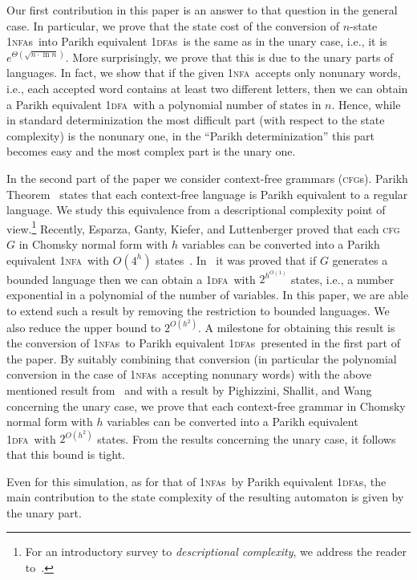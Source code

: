 \documentclass[11pt]{article}
\newcommand*{\ow}{\textsc{1}}
\newcommand*{\owdfa}{\ow\textsc{dfa}}
\newcommand*{\owdfas}{\ow\textsc{dfa}s}
\newcommand*{\ownfa}{\ow\textsc{nfa}}
\newcommand*{\ownfas}{\ow\textsc{nfa}s}
\newcommand*{\cfg}{\textsc{cfg}}
\newcommand*{\cfgs}{\textsc{cfg}s}
\begin{document}
Our first contribution in this paper is an answer to that question in the general case.
In particular, we prove that the state cost of the conversion of $n$-state \ownfas\ into Parikh equivalent \owdfas\ is the
same as in the unary case, i.e., it is $e^{\Theta(\sqrt{n \cdot \ln n})}$.
More surprisingly, we prove that this is due to the unary parts of languages.
In fact, we show that if the given \ownfa\ accepts only nonunary words, i.e., each accepted word contains at
least two different letters, then we can obtain a Parikh equivalent \owdfa\ with a 
polynomial number of states in $n$.
Hence, while in standard determinization the most difficult part (with respect to the state complexity)
is the nonunary one, in the ``Parikh determinization'' this part becomes easy and the most complex part is
the unary one.

In the second part of the paper we consider context-free grammars (\cfgs).
Parikh Theorem~\cite{Parikh1966} states that each context-free language is Parikh equivalent to a
regular language.
We study this equivalence {}from a descriptional complexity point of view.\footnote{For an introductory
survey to \emph{descriptional complexity}, we address the reader to~\cite{GoldstineKappesKLMW2002}.}
Recently, Esparza, Ganty, Kiefer, and Luttenberger proved that each \cfg~$G$ in Chomsky normal
form with $h$ variables can be converted into a Parikh equivalent \ownfa\ with $O(4^h)$ 
states~\cite{EsGaKiLu2011}.
In~\cite{LavadoPighizzini2012} it was proved that if $G$ generates a bounded language then we can 
obtain a \owdfa\ with $2^{h^{O(1)}}$ states, i.e., a number exponential in a polynomial of the number of
variables.
In this paper, we are able to extend such a result by removing the restriction to bounded languages.
We also reduce the upper bound to $2^{O(h^2)}$.
A milestone for obtaining this result is the conversion of \ownfas\ to Parikh equivalent \owdfas\
presented in the first part of the paper. By suitably combining that conversion (in particular the polynomial conversion in the case of \ownfas\ accepting nonunary words) with the above mentioned result 
{}from~\cite{EsGaKiLu2011} and with a result by Pighizzini, Shallit, and Wang~\cite{PighizziniShallitWang2002} concerning
the unary case, we prove that each context-free grammar in Chomsky normal form
with $h$ variables can be converted into
a Parikh equivalent \owdfa\ with $2^{O(h^2)}$ states. {}From the results concerning the unary case, it
follows that this bound is tight.

Even for this simulation, as for that of \ownfas\ by Parikh equivalent \owdfas, the main contribution to
the state complexity of the resulting automaton is given by the unary  part.
\end{document}
